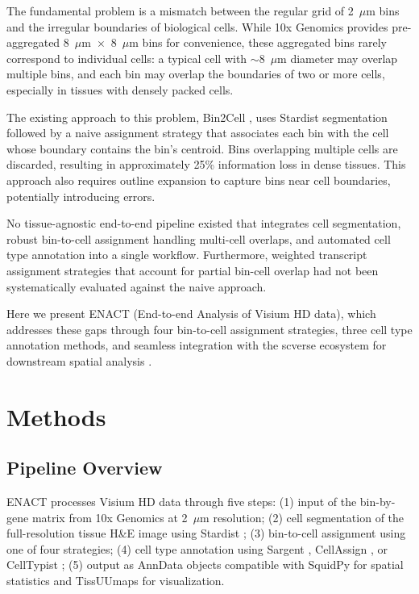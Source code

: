 \documentclass[11pt]{article}
\begin{document}
The fundamental problem is a mismatch between the regular grid of 2~$\mu$m bins and the irregular boundaries of biological cells. While 10x Genomics provides pre-aggregated 8~$\mu$m~$\times$~8~$\mu$m bins for convenience, these aggregated bins rarely correspond to individual cells: a typical cell with $\sim$8~$\mu$m diameter may overlap multiple bins, and each bin may overlap the boundaries of two or more cells, especially in tissues with densely packed cells.

The existing approach to this problem, Bin2Cell \citep{sountama2024bin2cell}, uses Stardist segmentation \citep{schmidt2018stardist} followed by a naive assignment strategy that associates each bin with the cell whose boundary contains the bin's centroid. Bins overlapping multiple cells are discarded, resulting in approximately 25\% information loss in dense tissues. This approach also requires outline expansion to capture bins near cell boundaries, potentially introducing errors.

No tissue-agnostic end-to-end pipeline existed that integrates cell segmentation, robust bin-to-cell assignment handling multi-cell overlaps, and automated cell type annotation into a single workflow. Furthermore, weighted transcript assignment strategies that account for partial bin-cell overlap had not been systematically evaluated against the naive approach.

Here we present ENACT (End-to-end Analysis of Visium HD data), which addresses these gaps through four bin-to-cell assignment strategies, three cell type annotation methods, and seamless integration with the scverse ecosystem for downstream spatial analysis \citep{virshup2024anndata, palla2022squidpy}.

\section{Methods}

\subsection{Pipeline Overview}

ENACT processes Visium HD data through five steps: (1) input of the bin-by-gene matrix from 10x Genomics at 2~$\mu$m resolution; (2) cell segmentation of the full-resolution tissue H\&E image using Stardist \citep{schmidt2018stardist}; (3) bin-to-cell assignment using one of four strategies; (4) cell type annotation using Sargent \citep{sargent2023celltype}, CellAssign \citep{zhang2023cellassign}, or CellTypist \citep{dominguez2022celltypist}; (5) output as AnnData objects compatible with SquidPy \citep{palla2022squidpy} for spatial statistics and TissUUmaps \citep{solorzano2024tissuumaps} for visualization.
\end{document}
